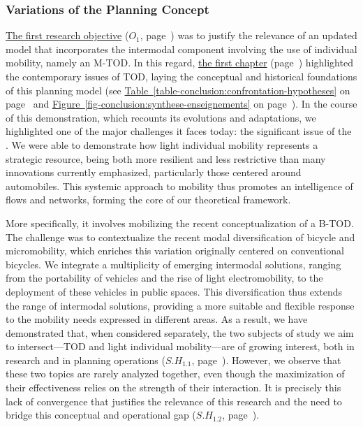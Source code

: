 \begin{refsegment}
\subsubsection*{Variations of the Planning Concept
    \label{conclusion-generale:principaux-apports-chapitre1}
    }

\hyperref[objectif-1]{The first research objective} (\(O_1\), page~\pageref{objectif-1}) was to justify the relevance of an updated model that incorporates the intermodal component involving the use of individual mobility, namely an \acrshort{M-TOD}. In this regard, \hyperref[chap1:titre]{the first chapter} (page~\pageref{chap1:titre}) highlighted the contemporary issues of \acrshort{TOD}, laying the conceptual and historical foundations of this planning model (see \hyperref[table-conclusion:confrontation-hypotheses]{Table~\ref{table-conclusion:confrontation-hypotheses}} on page~\pageref{table-conclusion:confrontation-hypotheses} and \hyperref[fig-conclusion:synthese-enseignements]{Figure~\ref{fig-conclusion:synthese-enseignements}} on page~\pageref{fig-conclusion:synthese-enseignements}). In the course of this demonstration, which recounts its evolutions and adaptations, we highlighted one of the major challenges it faces today: the significant issue of the . We were able to demonstrate how light individual mobility represents a strategic resource, being both more resilient and less restrictive than many innovations currently emphasized, particularly those centered around automobiles. This systemic approach to mobility thus promotes an intelligence of flows and networks, forming the core of our theoretical framework.%

More specifically, it involves mobilizing the recent conceptualization of a \acrfull{B-TOD}. The challenge was to contextualize the recent modal diversification of \gls{bicycle} and \gls{micromobility}, which enriches this variation originally centered on conventional bicycles. We integrate a multiplicity of emerging intermodal solutions, ranging from the portability of vehicles and the rise of light electromobility, to the deployment of these vehicles in public spaces. This diversification thus extends the range of intermodal solutions, providing a more suitable and flexible response to the mobility needs expressed in different areas. As a result, we have demonstrated that, when considered separately, the two subjects of study we aim to intersect—\acrshort{TOD} and light individual mobility—are of growing interest, both in research and in planning operations (\hyperref[sous-hypothese-1.1]{\(S.H_{1.1}\)}, page~\pageref{sous-hypothese-1.1}). However, we observe that these two topics are rarely analyzed together, even though the maximization of their effectiveness relies on the strength of their interaction. It is precisely this lack of convergence that justifies the relevance of this research and the need to bridge this conceptual and operational gap (\hyperref[sous-hypothese-1.2]{\(S.H_{1.2}\)}, page~\pageref{sous-hypothese-1.2}).%


\end{refsegment}
